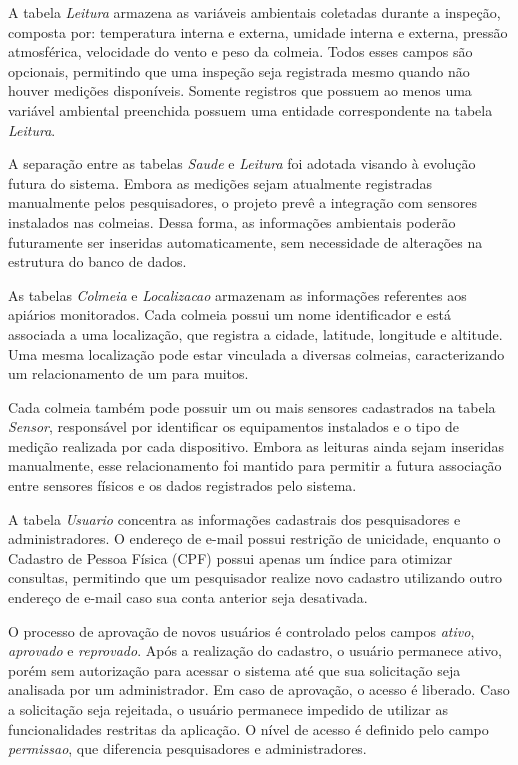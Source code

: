 \documentclass[12pt]{unisenaiclass}
\begin{document}
A tabela \textit{Leitura} armazena as variáveis ambientais coletadas durante a inspeção, composta por: temperatura interna e externa, umidade interna e externa, pressão atmosférica, velocidade do vento e peso da colmeia. Todos esses campos são opcionais, permitindo que uma inspeção seja registrada mesmo quando não houver medições disponíveis. Somente registros que possuem ao menos uma variável ambiental preenchida possuem uma entidade correspondente na tabela \textit{Leitura}.

A separação entre as tabelas \textit{Saude} e \textit{Leitura} foi adotada visando à evolução futura do sistema. Embora as medições sejam atualmente registradas manualmente pelos pesquisadores, o projeto prevê a integração com sensores instalados nas colmeias. Dessa forma, as informações ambientais poderão futuramente ser inseridas automaticamente, sem necessidade de alterações na estrutura do banco de dados.

As tabelas \textit{Colmeia} e \textit{Localizacao} armazenam as informações referentes aos apiários monitorados. Cada colmeia possui um nome identificador e está associada a uma localização, que registra a cidade, latitude, longitude e altitude. Uma mesma localização pode estar vinculada a diversas colmeias, caracterizando um relacionamento de um para muitos.

Cada colmeia também pode possuir um ou mais sensores cadastrados na tabela \textit{Sensor}, responsável por identificar os equipamentos instalados e o tipo de medição realizada por cada dispositivo. Embora as leituras ainda sejam inseridas manualmente, esse relacionamento foi mantido para permitir a futura associação entre sensores físicos e os dados registrados pelo sistema.

A tabela \textit{Usuario} concentra as informações cadastrais dos pesquisadores e administradores. O endereço de e-mail possui restrição de unicidade, enquanto o Cadastro de Pessoa Física (CPF) possui apenas um índice para otimizar consultas, permitindo que um pesquisador realize novo cadastro utilizando outro endereço de e-mail caso sua conta anterior seja desativada.

O processo de aprovação de novos usuários é controlado pelos campos \textit{ativo}, \textit{aprovado} e \textit{reprovado}. Após a realização do cadastro, o usuário permanece ativo, porém sem autorização para acessar o sistema até que sua solicitação seja analisada por um administrador. Em caso de aprovação, o acesso é liberado. Caso a solicitação seja rejeitada, o usuário permanece impedido de utilizar as funcionalidades restritas da aplicação. O nível de acesso é definido pelo campo \textit{permissao}, que diferencia pesquisadores e administradores.
\end{document}

